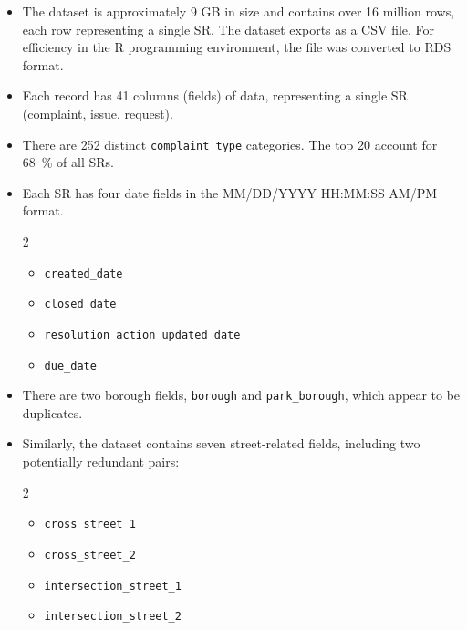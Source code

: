 \documentclass[linenumber]{jdsart}
\begin{document}
\begin{itemize}[left=1.5em, itemsep=0.25\baselineskip]
\item The dataset is approximately \num{9} GB in size and contains 
over \num{16} million rows, each row representing a single 
SR. The dataset exports as a CSV file. For efficiency in the R 
programming environment, the file was converted to RDS format.

\item Each record has \num{41} columns (fields) of data, representing 
a single SR (complaint, issue, request). 

\item There are \num{252} distinct \texttt{complaint\_type} categories.
The top \num{20} account for \SI{68}{\percent} of all SRs.
	
\item Each SR has four date fields in the MM/DD/YYYY HH:MM:SS AM/PM format.

\begin{multicols}{2}
\begin{itemize}[label=\textbullet]
  \item \texttt{created\_date}
  \item \texttt{closed\_date}
  \item \texttt{resolution\_action\_updated\_date}
  \item \texttt{due\_date}
\end{itemize}
\end{multicols}

\item There are two borough fields, \texttt{borough} and \texttt{park\_borough}, 
		which appear to be duplicates.
  
\item Similarly, the dataset contains seven street-related fields, including 
two potentially redundant pairs:

\begin{multicols}{2}
\begin{itemize}[label=\textbullet, itemsep=1.25pt]
    \item \texttt{cross\_street\_1}
    \item \texttt{cross\_street\_2}
    \vspace{5pt}

    \item \texttt{intersection\_street\_1}
    \item \texttt{intersection\_street\_2}
    \vspace{5pt}


\end{itemize}
\end{multicols}
\end{itemize}
\end{document}
